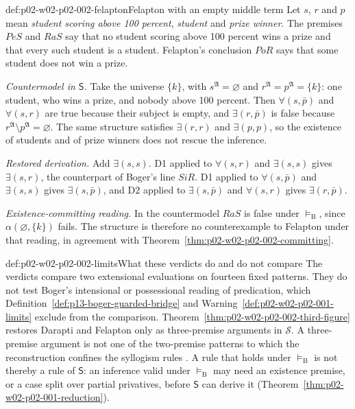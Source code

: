 \begin{hbexample}{def:p02-w02-p02-002-felapton}{Felapton with an empty middle term}
Let \(s\), \(r\) and \(p\) mean \emph{student scoring above 100 percent},
\emph{student} and \emph{prize winner}. The premises \(PeS\) and \(RaS\)
say that no student scoring above 100 percent wins a prize and that every
such student is a student. Felapton's conclusion \(PoR\) says that some
student does not win a prize.

\emph{Countermodel in \(\mathsf S\).} Take the universe \(\{k\}\), with
\(s^{\mathfrak A}=\varnothing\) and
\(r^{\mathfrak A}=p^{\mathfrak A}=\{k\}\): one student, who wins a prize,
and nobody above 100 percent. Then \(\forall(s,\bar p)\) and
\(\forall(s,r)\) are true because their subject is empty, and
\(\exists(r,\bar p)\) is false because \(r^{\mathfrak A}\setminus
p^{\mathfrak A}=\varnothing\). The same structure satisfies \(\exists(r,r)\)
and \(\exists(p,p)\), so the existence of students and of prize winners does
not rescue the inference.

\emph{Restored derivation.} Add \(\exists(s,s)\). D1 applied to
\(\forall(s,r)\) and \(\exists(s,s)\) gives \(\exists(s,r)\), the
counterpart of Boger's line \(SiR\). D1 applied to \(\forall(s,\bar p)\) and
\(\exists(s,s)\) gives \(\exists(s,\bar p)\), and D2 applied to
\(\exists(s,\bar p)\) and \(\forall(s,r)\) gives \(\exists(r,\bar p)\).

\emph{Existence-committing reading.} In the countermodel \(RaS\) is false
under \(\models_{\mathrm B}\), since \(\alpha(\varnothing,\{k\})\) fails. The
structure is therefore no counterexample to Felapton under that reading, in
agreement with Theorem~\ref{thm:p02-w02-p02-002-committing}.
\end{hbexample}

\begin{hbwarning}{def:p02-w02-p02-002-limits}{What these verdicts do and do not compare}
The verdicts compare two extensional evaluations on fourteen fixed
patterns. They do not test Boger's intensional or possessional reading of
predication, which Definition~\ref{def:p13-boger-guarded-bridge} and
Warning~\ref{def:p02-w02-p02-001-limits} exclude from the comparison.
Theorem~\ref{thm:p02-w02-p02-002-third-figure} restores Darapti and Felapton
only as three-premise arguments in \(\mathcal S\). A three-premise argument
is not one of the two-premise patterns to which the reconstruction confines
the syllogism rules \cite[p.~166]{Boger2004UnderlyingLogic}. A rule
that holds under \(\models_{\mathrm B}\) is not thereby a rule of
\(\mathsf S\): an inference valid under \(\models_{\mathrm B}\) may need an
existence premise, or a case split over partial privatives, before
\(\mathsf S\) can derive it
(Theorem~\ref{thm:p02-w02-p02-001-reduction}).
\end{hbwarning}

